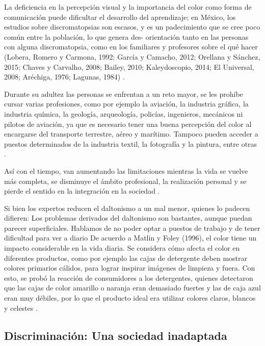 \documentclass[10pt]{article}
\begin{document}
La deficiencia en la percepción visual y la importancia del color como forma de comunicación puede dificultar el desarrollo del aprendizaje; en México, los estudios sobre discromatopsias son escasos, y es un padecimiento que se cree poco común entre la población, lo que genera des- orientación tanto en las personas con alguna discromatopsia, como en los familiares y profesores sobre el qué hacer (Lobera, Romero y Carmona, 1992; García y Camacho, 2012; Orellana y Sánchez, 2015; Chaves y Carvalho, 2008; Bailey, 2010; Kaleydoscopio, 2014; El Universal, 2008; Aréchiga, 1976; Lagunas, 1984) \cite{IEEEreferencias:Ref27}.

Durante su adultez las personas se enfrentan a un reto mayor, se les prohíbe cursar varias profesiones, como por ejemplo la aviación, la industria gráfica, la industria química, la geología, arqueología, policías, ingenieros, mecánicos ni pilotos de aviación, ya que es necesario tener una buena percepción del color al encargarse del transporte terrestre, aéreo y marítimo. Tampoco pueden acceder a puestos determinados de la industria textil, la fotografía y la pintura, entre otras \cite{IEEEreferencias:Ref32}\cite{IEEEreferencias:Ref1}.

Así con el tiempo, van aumentando las limitaciones mientras la vida se vuelve más completa, se disminuye el ámbito profesional, la realización personal y se pierde el sentido en la integración en la sociedad \cite{IEEEreferencias:Ref32}.

Si bien los expertos reducen el daltonismo a un mal menor, quienes lo padecen difieren: Los problemas derivados del daltonismo son bastantes, aunque puedan parecer superficiales. Hablamos de no poder optar a puestos de trabajo y de tener dificultad para ver a diario \cite{IEEEreferencias:Ref1}
De acuerdo a Matlin y Foley (1996), el color tiene un impacto considerable en la vida diaria. Se considera cómo afecta el color en diferentes productos, como por ejemplo las cajas de detergente deben mostrar colores primarios cálidos, para lograr inspirar imágenes de limpieza y fuera. Con esto, se probó la reacción de consumidores a los detergentes, quienes detectaron que las cajas de color amarillo o naranja eran demasiado fuertes y las de caja azul eran muy débiles, por lo que el producto ideal era utilizar colores claros, blancos y celestes \cite{IEEEreferencias:Ref32}.

\subsection{Discriminación: Una sociedad inadaptada}
\end{document}
